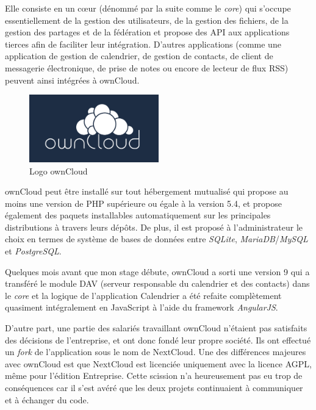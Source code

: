 \documentclass[10pt,a4paper, twoside]{report}
\begin{document}
	Elle consiste en un cœur (dénommé par la suite comme le \textit{core}) qui s'occupe essentiellement de la gestion des utilisateurs, de la gestion des fichiers, de la gestion des partages et de la fédération et propose des API aux applications tierces afin de faciliter leur intégration. D'autres applications (comme une application de gestion de calendrier, de gestion de contacts, de client de messagerie électronique, de prise de notes ou encore de lecteur de flux RSS) peuvent ainsi intégrées à ownCloud.
	
	\begin{figure}[ht]
		\centering
		\includegraphics[width=0.5\textwidth]{images/owncloud-logo.png}
		\caption*{Logo ownCloud}
		\label{normal_case}
	\end{figure}
	
	ownCloud peut être installé sur tout hébergement mutualisé qui propose au moins une version de PHP supérieure ou égale à la version 5.4, et propose également des paquets installables automatiquement sur les principales distributions à travers leurs dépôts. De plus, il est proposé à l'administrateur le choix en termes de système de bases de données entre \textit{SQLite}, \textit{MariaDB}/\textit{MySQL} et \textit{PostgreSQL}.
	
	Quelques mois avant que mon stage débute, ownCloud a sorti une version 9 qui a transféré le module DAV (serveur responsable du calendrier et des contacts) dans le \textit{core} et la logique de l'application Calendrier a été refaite complètement quasiment intégralement en JavaScript à l'aide du framework \textit{AngularJS}.
	
	D'autre part, une partie des salariés travaillant ownCloud n'étaient pas satisfaits des décisions de l'entreprise, et ont donc fondé leur propre société. Ils ont effectué un \textit{fork} de l'application sous le nom de NextCloud. Une des différences majeures avec ownCloud est que NextCloud est licenciée uniquement avec la licence AGPL, même pour l'édition Entreprise. Cette scission n'a heureusement pas eu trop de conséquences car il s'est avéré que les deux projets continuaient à communiquer et à échanger du code.
	
\end{document}
